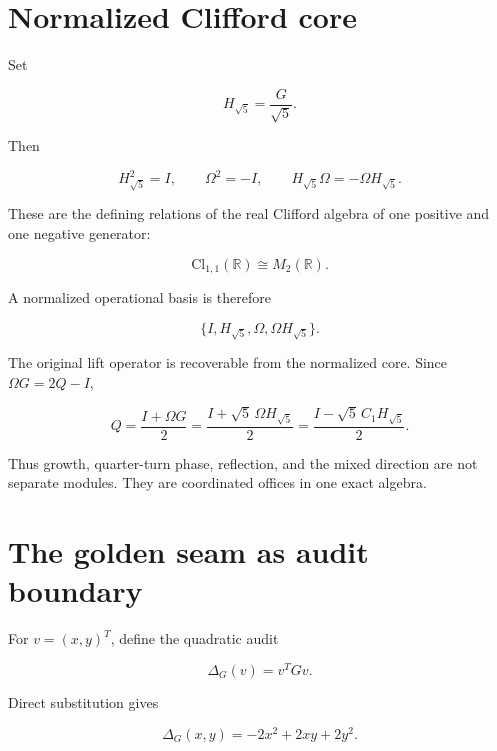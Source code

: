 \documentclass[11pt,letterpaper]{article}
\theoremstyle{clearonyx}
\newcommand{\R}{\mathbb{R}}
\newcommand{\Cl}{\mathrm{Cl}}
\begin{document}
\section{Normalized Clifford core}

Set

\begin{equation}
H_{\sqrt5}=\frac{G}{\sqrt5}.
\end{equation}

Then

\begin{equation}
H_{\sqrt5}^2=I,
\qquad
\Omega^2=-I,
\qquad
H_{\sqrt5}\Omega=-\Omega H_{\sqrt5}.
\end{equation}

These are the defining relations of the real Clifford algebra of one positive and one negative generator:

\begin{equation}
\Cl_{1,1}(\R)\cong M_2(\R).
\end{equation}

A normalized operational basis is therefore

\begin{equation}
\{I,H_{\sqrt5},\Omega,\Omega H_{\sqrt5}\}.
\end{equation}

The original lift operator is recoverable from the normalized core.  Since $\Omega G=2Q-I$,

\begin{equation}
Q=\frac{I+\Omega G}{2}
 =\frac{I+\sqrt5\,\Omega H_{\sqrt5}}{2}
 =\frac{I-\sqrt5\,C_1H_{\sqrt5}}{2}.
\end{equation}

Thus growth, quarter-turn phase, reflection, and the mixed direction are not separate modules.  They are coordinated offices in one exact algebra.

\section{The golden seam as audit boundary}

For $v=(x,y)^T$, define the quadratic audit

\begin{equation}
\Delta_G(v)=v^TGv.
\end{equation}

Direct substitution gives

\begin{equation}
\Delta_G(x,y)=-2x^2+2xy+2y^2.
\end{equation}
\end{document}
